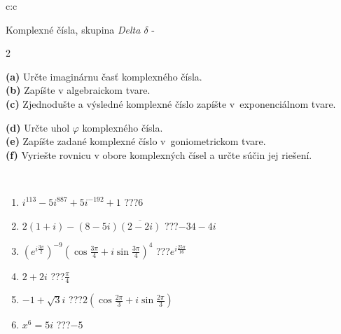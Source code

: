 \documentclass[10pt]{report}
\begin{document}
\begin{tabular}{c:c}
\begin{minipage}[c][104.5mm][t]{0.5\linewidth}
\begin{center}
\vspace{7mm}
{\huge Komplexné čísla, skupina \textit{Delta $\delta$} -}\\[5mm]
\begin{minipage}{0.95\linewidth}
\begin{center}
{\small \begin{multicols}{2} \raggedright
\textbf{(a)} Určte imaginárnu časť komplexného čísla. \\[1mm]
\textbf{(b)} Zapíšte v algebraickom tvare. \\[1mm]
\textbf{(c)} Zjednodušte a výsledné komplexné číslo zapíšte v~exponenciálnom tvare. \par \columnbreak
\textbf{(d)} Určte uhol \(\varphi\) komplexného čísla. \\[1mm]
\textbf{(e)} Zapíšte zadané komplexné číslo v~goniometrickom tvare. \\[1mm]
\textbf{(f)} Vyriešte rovnicu v obore komplexných čísel a určte súčin jej riešení.
\end{multicols}
}
\end{center}
\end{minipage}
\\[4mm]
\begin{minipage}{0.79\linewidth}
\begin{center}
\begin{varwidth}{\linewidth}
\begin{enumerate}
\large
\item $i^{113}-5i^{887}+5i^{-192}+1$\quad \dotfill\; ???\;\dotfill \quad $6$
\item $2(1+i)-(8-5i)\overline{(2-2i)}$\quad \dotfill\; ???\;\dotfill \quad $-34-4i$
\item $\left(e^{i\frac{3\pi}{2}}\right)^{-9}\left(\cos{\frac{3\pi}{4}}+i\sin{\frac{3\pi}{4}}\right)^{4}$\quad \dotfill\; ???\;\dotfill \quad $e^{i\frac{25\pi}{16}}$
\item $2+2i$\quad \dotfill\; ???\;\dotfill \quad $\frac{\pi}{4}$
\item $-1+\sqrt{3}i$\quad \dotfill\; ???\;\dotfill \quad $2\left(\cos{\frac{2\pi}{3}}+i\sin{\frac{2\pi}{3}}\right)$
\item $x^6=5i$\quad \dotfill\; ???\;\dotfill \quad $-5$
\end{enumerate}
\end{varwidth}

\end{center}
\end{minipage}
\end{center}
\end{minipage}
\end{tabular}
\end{document}
